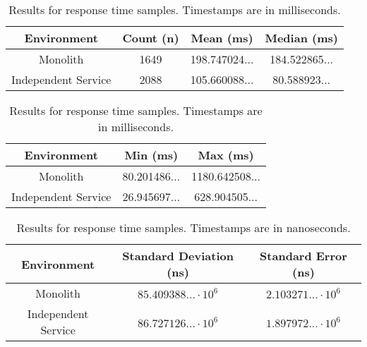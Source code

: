 \begin{table}[h!]
    \begin{tabular}{|c|c|c|c|} 
        \hline
        Environment
        & Count (n)
        & Mean (ms)
        & Median (ms) \\ [0.5ex] 
        
        \hline\hline
        Monolith
        & 1649
        & 198.747024...
        & 184.522865...\\ 
        
        Independent Service
        & 2088
        & 105.660088...
        & 80.588923... \\
        \hline
    \end{tabular}
    \caption{Results for response time samples. Timestamps are in milliseconds.}
    \label{table:response time results:1}
\end{table}

\begin{table}[h!]
    \begin{tabular}{|c|c|c|} 
        \hline
        Environment
        & Min (ms)
        & Max (ms) \\ [0.5ex] 
        
        \hline\hline
        Monolith
        & 80.201486... 
        & 1180.642508... \\ 
        
        Independent Service
        & 26.945697... 
        & 628.904505...  \\
        \hline
    \end{tabular}
    \caption{Results for response time samples. Timestamps are in milliseconds.}
    \label{table:response time results:2}
\end{table}

\begin{table}[h!]
    \begin{tabular}{|c|c|c|} 
        \hline
        Environment
        & Standard Deviation (ns)
        & Standard Error (ns) \\ [0.5ex] 
        
        \hline\hline
        Monolith
        & $85.409388... \cdot 10^6$
        & $2.103271... \cdot 10^6$ \\ 
        
        Independent Service
        & $86.727126... \cdot 10^6$
        & $1.897972... \cdot 10^6$ \\ 
         \hline
    \end{tabular}
    \caption{Results for response time samples. Timestamps are in nanoseconds.}
    \label{table:response time results:3}
\end{table}

